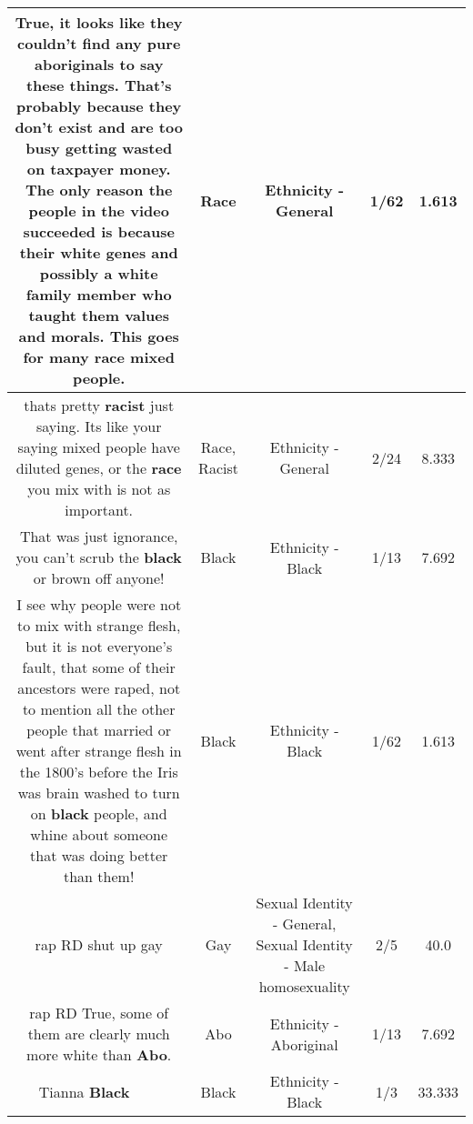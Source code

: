 \documentclass[11pt]{article}
\newlength\mylength
\begin{document}
\begin{center}
\begin{longtable}{|C{.65\mylength}|C{.30\mylength}|C{.12\mylength}|C{.12\mylength}|C{.12\mylength}|}
  \small True, it looks like they couldn't find any pure aboriginals to say these things. That's probably because they don't exist and are too busy getting wasted on taxpayer money. The only reason the people in the video succeeded is because their white genes and possibly a white family member who taught them values and morals. This goes for many \textbf{race} mixed people.\normalsize   & Race & Ethnicity - General & 1/62 & 1.613 \\  \hline
  \small thats pretty \textbf{racist} just saying. Its like your saying mixed people have diluted genes, or the \textbf{race} you mix with is not as important.\normalsize   & Race, Racist & Ethnicity - General & 2/24 & 8.333 \\  \hline
  \small That was just ignorance, you can't scrub the \textbf{black} or brown off anyone!\normalsize   & Black & Ethnicity - Black & 1/13 & 7.692 \\  \hline
  \small I see why people were not to mix with strange flesh, but it is not everyone's fault, that some of their ancestors were raped, not to mention all the other people that married or went after strange flesh in the 1800's before the Iris was brain washed to turn on \textbf{black} people, and whine about someone that was doing better than them!\normalsize   & Black & Ethnicity - Black & 1/62 & 1.613 \\  \hline
  \small rap RD shut up gay\normalsize   & Gay & Sexual Identity - General, Sexual Identity - Male homosexuality & 2/5 & 40.0 \\  \hline
  \small rap RD True, some of them are clearly much more white than \textbf{Abo}.\normalsize   & Abo & Ethnicity - Aboriginal & 1/13 & 7.692 \\  \hline
  \small Tianna \textbf{Black} 👏🏻👏🏽👏🏿\normalsize   & Black & Ethnicity - Black & 1/3 & 33.333 \\  \hline

\end{longtable}
\end{center}
\end{document}
